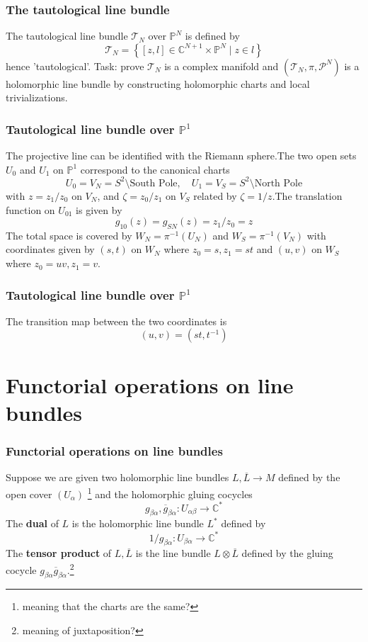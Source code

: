 \documentclass{beamer}
\begin{document}
\begin{frame}
\frametitle{The tautological line bundle}

The tautological line bundle $\mathcal{T}_N$ over $\mathbb{P}^N$ is defined by \[\mathcal{T}_N = \left\{[z,l]\in \mathbb{C}^{N+1}\times \mathbb{P}^N \mid z \in l\right\}\] hence 'tautological'. \newline Task: prove $\mathcal{T}_N$ is a complex manifold and $(\mathcal{T}_N,\pi,\mathcal{P}^N)$ is a holomorphic line bundle by constructing holomorphic charts and local trivializations.

\end{frame}

\begin{frame}
\frametitle{Tautological line bundle over $\mathbb{P}^1$}

The projective line can be identified with the Riemann sphere.\newline The two open sets $U_0$ and $U_1$ on $\mathbb{P}^1$ correspond to the canonical charts \[U_0 = V_N = S^2 \setminus \text{South Pole}, \quad U_1 = V_S = S^2 \setminus \text{North Pole}\] with $z = z_1/z_0$ on $V_N$, and $\zeta = z_0/z_1$ on $V_S$ related by $\zeta = 1/z$.\newline The translation function on $U_{01}$ is given by \[g_{10}(z) = g_{SN}(z) = z_1/z_0 = z\] The total space is covered by $W_N = \pi^{-1}(U_N)$ and $W_S = \pi^{-1}(V_N)$ with coordinates given by $(s,t)$ on $W_N$ where $z_0 = s, z_1 = st$ and $(u,v)$ on $W_S$ where $z_0 = uv, z_1 = v$.

\end{frame}

\begin{frame}
\frametitle{Tautological line bundle over $\mathbb{P}^1$}

The transition map between the two coordinates is \[(u,v) = (st,t^{-1})\]

\end{frame}



\section{Functorial operations on line bundles}

\begin{frame}
\frametitle{Functorial operations on line bundles}

Suppose we are given two holomorphic line bundles $L, \overline{L} \to M$ defined by the open cover $(U_\alpha)$ \footnote{meaning that the charts are the same?} and the holomorphic gluing cocycles \[g_{\beta\alpha},\overline{g}_{\beta\alpha} : U_{\alpha\beta} \to \mathbb{C}^*\] The \textbf{dual} of $L$ is the holomorphic line bundle $L^*$ defined by \[1/g_{\beta\alpha} : U_{\beta\alpha} \to \mathbb{C}^*\] The \textbf{tensor product} of $L, \overline{L}$ is the line bundle $L \otimes \overline{L}$ defined by the gluing cocycle $g_{\beta\alpha}\overline{g}_{\beta\alpha}$.\footnote{meaning of juxtaposition?}

\end{frame}
\end{document}
